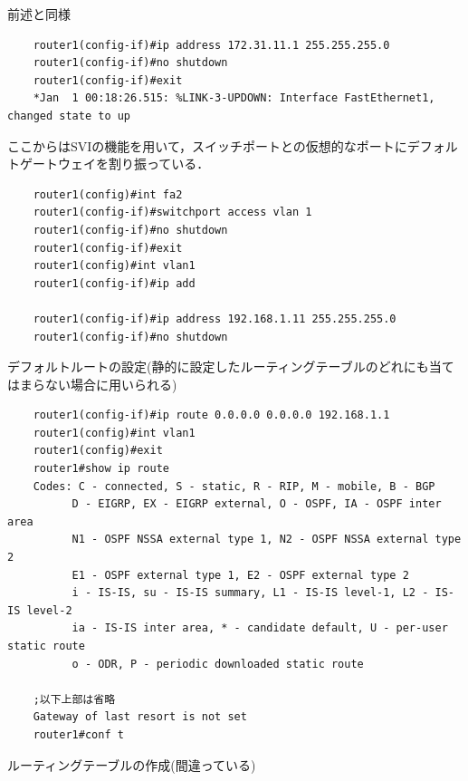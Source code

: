 \documentclass{jlreq}
\begin{document}
    前述と同様
    \begin{lstlisting}    
    router1(config-if)#ip address 172.31.11.1 255.255.255.0
    router1(config-if)#no shutdown
    router1(config-if)#exit
    *Jan  1 00:18:26.515: %LINK-3-UPDOWN: Interface FastEthernet1, changed state to up
    \end{lstlisting}
    ここからはSVIの機能を用いて，スイッチポートとの仮想的なポートにデフォルトゲートウェイを割り振っている．
    \begin{lstlisting}
    router1(config)#int fa2
    router1(config-if)#switchport access vlan 1
    router1(config-if)#no shutdown
    router1(config-if)#exit
    router1(config)#int vlan1
    router1(config-if)#ip add

    router1(config-if)#ip address 192.168.1.11 255.255.255.0
    router1(config-if)#no shutdown
    \end{lstlisting}
    デフォルトルートの設定(静的に設定したルーティングテーブルのどれにも当てはまらない場合に用いられる)
    \begin{lstlisting}
    router1(config-if)#ip route 0.0.0.0 0.0.0.0 192.168.1.1
    router1(config)#int vlan1
    router1(config)#exit
    router1#show ip route
    Codes: C - connected, S - static, R - RIP, M - mobile, B - BGP
          D - EIGRP, EX - EIGRP external, O - OSPF, IA - OSPF inter area 
          N1 - OSPF NSSA external type 1, N2 - OSPF NSSA external type 2
          E1 - OSPF external type 1, E2 - OSPF external type 2
          i - IS-IS, su - IS-IS summary, L1 - IS-IS level-1, L2 - IS-IS level-2
          ia - IS-IS inter area, * - candidate default, U - per-user static route
          o - ODR, P - periodic downloaded static route

    ;以下上部は省略
    Gateway of last resort is not set
    router1#conf t
    \end{lstlisting}
    ルーティングテーブルの作成(間違っている)
\end{document}

